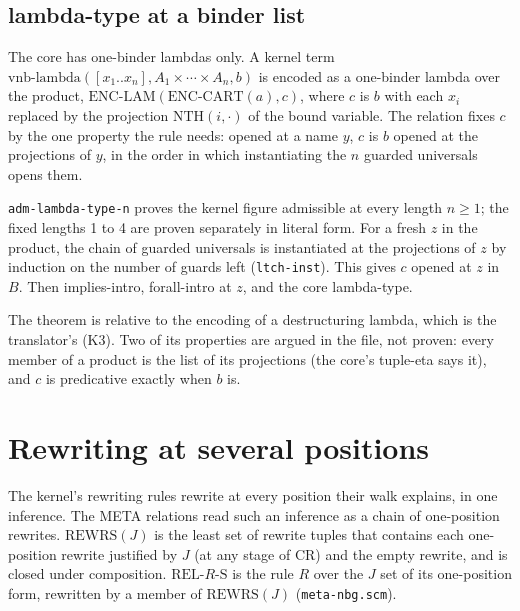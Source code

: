 \subsection{lambda-type at a binder list}

The core has one-binder lambdas only.  A kernel term
$\mathrm{vnb\text{-}lambda}([x_1..x_n], A_1 \times \cdots \times A_n, b)$
is encoded as a one-binder lambda over the product,
$\mathrm{ENC\text{-}LAM}(\mathrm{ENC\text{-}CART}(a), c)$, where $c$ is $b$
with each $x_i$ replaced by the projection $\mathrm{NTH}(i, \cdot)$ of the
bound variable.  The relation fixes $c$ by the one property the rule
needs: opened at a name $y$, $c$ is $b$ opened at the projections of $y$,
in the order in which instantiating the $n$ guarded universals opens
them.

\texttt{adm-lambda-type-n} proves the kernel figure admissible at every
length $n \geq 1$; the fixed lengths 1 to 4 are proven separately in
literal form.  For a fresh $z$ in the product, the chain of guarded
universals is instantiated at the projections of $z$ by induction on the
number of guards left (\texttt{ltch-inst}).  This gives $c$ opened at $z$
in $B$.  Then implies-intro, forall-intro at $z$, and the core
lambda-type.

The theorem is relative to the encoding of a destructuring lambda,
which is the translator's (K3).  Two of its properties are argued in
the file, not proven: every member of a product is the list of its
projections (the core's tuple-eta says it), and $c$ is predicative
exactly when $b$ is.

\section{Rewriting at several positions}\label{sec:meta-positions}

The kernel's rewriting rules rewrite at every position their walk
explains, in one inference.  The META relations read such an inference
as a chain of one-position rewrites.
$\mathrm{REWRS}(J)$ is the least set of rewrite tuples that contains
each one-position rewrite justified by $J$ (at any stage of CR) and the
empty rewrite, and is closed under composition.
$\mathrm{REL\text{-}}R\mathrm{\text{-}S}$ is the rule $R$ over the $J$
set of its one-position form, rewritten by a member of
$\mathrm{REWRS}(J)$ (\texttt{meta-nbg.scm}).


